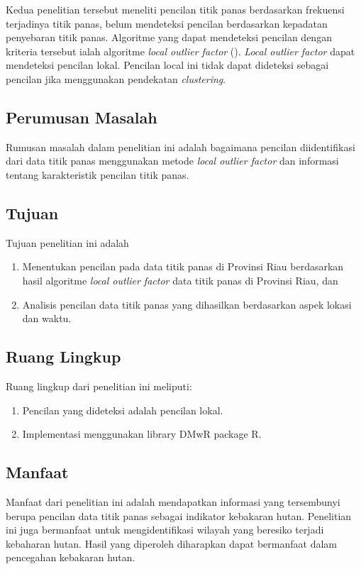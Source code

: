 Kedua penelitian tersebut meneliti pencilan titik panas berdasarkan frekuensi terjadinya titik panas, belum mendeteksi pencilan berdasarkan kepadatan penyebaran titik panas. Algoritme yang dapat mendeteksi pencilan dengan kriteria tersebut ialah algoritme \textit{local outlier factor} (\cite{Beunig2010}). \textit{Local outlier factor} dapat mendeteksi pencilan lokal. Pencilan local ini tidak dapat dideteksi sebagai pencilan jika menggunakan pendekatan \textit{clustering}.


\subsection*{Perumusan Masalah}
Rumusan masalah dalam penelitian ini adalah bagaimana pencilan diidentifikasi dari data titik panas menggunakan metode \textit{local outlier factor}  dan  informasi tentang karakteristik pencilan titik panas. 

\subsection*{Tujuan}
Tujuan penelitian ini adalah 
\begin{enumerate}[noitemsep] 
	\item Menentukan pencilan pada data titik panas di Provinsi Riau berdasarkan hasil algoritme \textit{local outlier factor} data titik panas di Provinsi Riau, dan
	\item Analisis pencilan data titik panas yang dihasilkan berdasarkan aspek lokasi dan waktu.
\end{enumerate}

\subsection*{Ruang Lingkup}
Ruang lingkup dari penelitian ini meliputi: 
\begin{enumerate}[noitemsep] 
\item Pencilan yang dideteksi adalah pencilan lokal.
\item Implementasi menggunakan library DMwR package R.
\end{enumerate}

\subsection*{Manfaat}
Manfaat dari penelitian ini adalah mendapatkan informasi yang tersembunyi berupa pencilan data titik panas sebagai indikator kebakaran hutan. Penelitian ini juga bermanfaat untuk mengidentifikasi wilayah yang beresiko terjadi kebaharan hutan. Hasil yang diperoleh diharapkan dapat bermanfaat dalam pencegahan kebakaran hutan.

